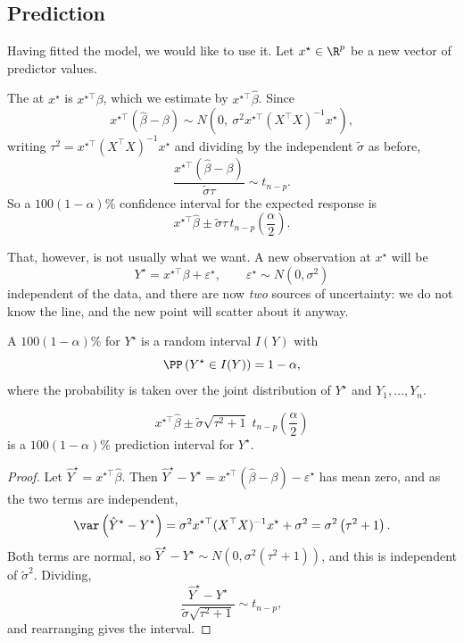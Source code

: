 \subsection{Prediction}

Having fitted the model, we would like to use it. Let $x^\star \in \R^p$ be a new vector of predictor values.

The  at $x^\star$ is $x^{\star\top}\beta$, which we estimate by $x^{\star\top}\hat\beta$. Since
$$
x^{\star\top}\left(\hat\beta-\beta\right)\sim N\left(0,\ \sigma^2 x^{\star\top}(X^\top X)^{-1}x^\star\right),
$$
writing $\tau^2 = x^{\star\top}(X^\top X)^{-1}x^\star$ and dividing by the independent $\tilde\sigma$ as before,
$$
\frac{x^{\star\top}(\hat\beta-\beta)}{\tilde\sigma\tau}\sim t_{n-p}.
$$
So a $100(1-\alpha)\%$ confidence interval for the expected response is
$$
x^{\star\top}\hat\beta \pm \tilde\sigma\tau\, t_{n-p}\!\left(\frac\alpha2\right).
$$

That, however, is not usually what we want. A new observation at $x^\star$ will be
$$
Y^\star = x^{\star\top}\beta + \varepsilon^\star, \qquad \varepsilon^\star\sim N(0,\sigma^2)
$$
independent of the data, and there are now \emph{two} sources of uncertainty: we do not know the line, and the new point will scatter about it anyway.

\begin{definition}
  A $100(1-\alpha)\%$  for $Y^\star$ is a random interval $I(Y)$ with
  $$
  \PP\left(Y^\star \in I(Y)\right) = 1-\alpha,
  $$
  where the probability is taken over the joint distribution of $Y^\star$ and $Y_1,\dots,Y_n$.
\end{definition}

\begin{proposition}
  $$
  x^{\star\top}\hat\beta \pm \tilde\sigma\sqrt{\tau^2+1}\;t_{n-p}\!\left(\frac\alpha2\right)
  $$
  is a $100(1-\alpha)\%$ prediction interval for $Y^\star$.
\end{proposition}
\begin{proof}
  Let $\hat Y^\star = x^{\star\top}\hat\beta$. Then $\hat Y^\star - Y^\star = x^{\star\top}(\hat\beta-\beta)-\varepsilon^\star$ has mean zero, and as the two terms are independent,
  $$
  \var\left(\hat Y^\star - Y^\star\right) = \sigma^2 x^{\star\top}(X^\top X)^{-1}x^\star + \sigma^2 = \sigma^2\left(\tau^2+1\right).
  $$
  Both terms are normal, so $\hat Y^\star - Y^\star \sim N\left(0,\sigma^2(\tau^2+1)\right)$, and this is independent of $\tilde\sigma^2$. Dividing,
  $$
  \frac{\hat Y^\star - Y^\star}{\tilde\sigma\sqrt{\tau^2+1}}\sim t_{n-p},
  $$
  and rearranging gives the interval.
\end{proof}

